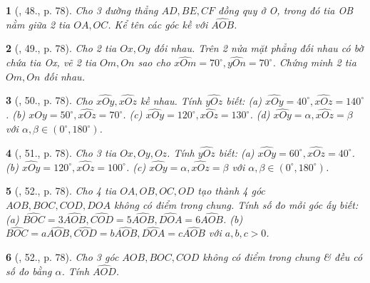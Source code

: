 \documentclass{article}
\newtheorem{baitoan}{}
\begin{document}
\begin{baitoan}[\cite{Binh_Toan_6_tap_2}, 48., p. 78]
	Cho 3 đường thẳng $AD,BE,CF$ đồng quy ở O, trong đó tia OB nằm giữa 2 tia $OA,OC$. Kể tên các góc kề với $\widehat{AOB}$.
\end{baitoan}

\begin{baitoan}[\cite{Binh_Toan_6_tap_2}, 49., p. 78]
	Cho 2 tia $Ox,Oy$ đối nhau. Trên 2 nửa mặt phẳng đối nhau có bờ chứa tia Ox, vẽ 2 tia $Om,On$ sao cho $\widehat{xOm} = 70^\circ,\widehat{yOn} = 70^\circ$. Chứng minh 2 tia $Om,On$ đối nhau.
\end{baitoan}

\begin{baitoan}[\cite{Binh_Toan_6_tap_2}, 50., p. 78]
	Cho $\widehat{xOy},\widehat{xOz}$ kề nhau. Tính $\widehat{yOz}$ biết: (a) $\widehat{xOy} = 40^\circ,\widehat{xOz} = 140^\circ$. (b) $\widehat{xOy} = 50^\circ,\widehat{xOz} = 70^\circ$. (c) $\widehat{xOy} = 120^\circ,\widehat{xOz} = 130^\circ$. (d) $\widehat{xOy} = \alpha,\widehat{xOz} = \beta$ với $\alpha,\beta\in(0^\circ,180^\circ)$.
\end{baitoan}

\begin{baitoan}[\cite{Binh_Toan_6_tap_2}, 51., p. 78]
	Cho 3 tia $Ox,Oy,Oz$. Tính $\widehat{yOz}$ biết: (a) $\widehat{xOy} = 60^\circ,\widehat{xOz} = 40^\circ$. (b) $\widehat{xOy} = 120^\circ,\widehat{xOz} = 100^\circ$. (c) $\widehat{xOy} = \alpha,\widehat{xOz} = \beta$ với $\alpha,\beta\in(0^\circ,180^\circ)$.
\end{baitoan}

\begin{baitoan}[\cite{Binh_Toan_6_tap_2}, 52., p. 78]
	Cho 4 tia $OA,OB,OC,OD$ tạo thành 4 góc $AOB,BOC,COD,DOA$ không có điểm trong chung. Tính số đo mỗi góc ấy biết: (a) $\widehat{BOC} = 3\widehat{AOB},\widehat{COD} = 5\widehat{AOB},\widehat{DOA} = 6\widehat{AOB}$. (b) $\widehat{BOC} = a\widehat{AOB},\widehat{COD} = b\widehat{AOB},\widehat{DOA} = c\widehat{AOB}$ với $a,b,c > 0$.
\end{baitoan}

\begin{baitoan}[\cite{Binh_Toan_6_tap_2}, 52., p. 78]
	Cho 3 góc $AOB,BOC,COD$ không có điểm trong chung \& đều có số đo bằng $\alpha$. Tính $\widehat{AOD}$.
\end{baitoan}

\end{document}

